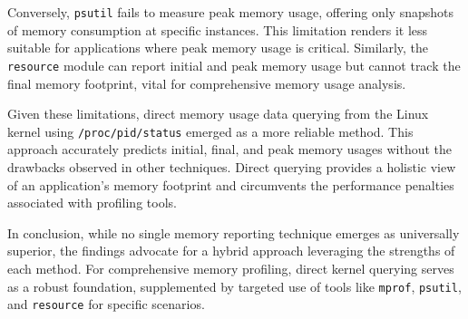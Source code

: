Conversely, \texttt{psutil} fails to measure peak memory usage, offering only snapshots of memory consumption at specific instances.
This limitation renders it less suitable for applications where peak memory usage is critical.
Similarly, the \texttt{resource} module can report initial and peak memory usage but cannot track the final memory footprint, vital for comprehensive memory usage analysis.

Given these limitations, direct memory usage data querying from the Linux kernel using \texttt{/proc/pid/status} emerged as a more reliable method.
This approach accurately predicts initial, final, and peak memory usages without the drawbacks observed in other techniques.
Direct querying provides a holistic view of an application's memory footprint and circumvents the performance penalties associated with profiling tools.

In conclusion, while no single memory reporting technique emerges as universally superior, the findings advocate for a hybrid approach leveraging the strengths of each method.
For comprehensive memory profiling, direct kernel querying serves as a robust foundation, supplemented by targeted use of tools like \texttt{mprof}, \texttt{psutil}, and \texttt{resource} for specific scenarios.
